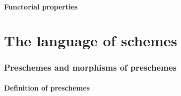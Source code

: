 \documentclass[10pt]{amsart}
\begin{document}
        \subsection{Functorial properties}
        


\clearpage


\part{The language of schemes}

    \section{Preschemes and morphisms of preschemes}

        \subsection{Definition of preschemes}
        
\end{document}
